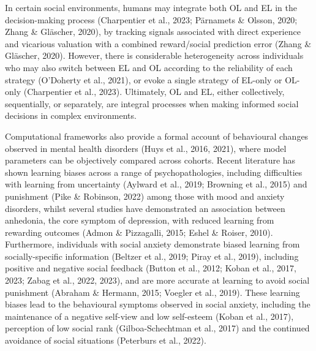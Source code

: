 \documentclass[12pt,a4paper,oneside,]{book} %
\begin{document}
In certain social environments, humans may integrate both OL and EL in the decision-making process (Charpentier et al., 2023; Pärnamets \& Olsson, 2020; Zhang \& Gläscher, 2020), by tracking signals associated with direct experience and vicarious valuation with a combined reward/social prediction error (Zhang \& Gläscher, 2020). However, there is considerable heterogeneity across individuals who may also switch between EL and OL according to the reliability of each strategy (O'Doherty et al., 2021), or evoke a single strategy of EL-only or OL-only (Charpentier et al., 2023). Ultimately, OL and EL, either collectively, sequentially, or separately, are integral processes when making informed social decisions in complex environments.

Computational frameworks also provide a formal account of behavioural changes observed in mental health disorders (Huys et al., 2016, 2021), where model parameters can be objectively compared across cohorts. Recent literature has shown learning biases across a range of psychopathologies, including difficulties with learning from uncertainty (Aylward et al., 2019; Browning et al., 2015) and punishment (Pike \& Robinson, 2022) among those with mood and anxiety disorders, whilst several studies have demonstrated an association between anhedonia, the core symptom of depression, with reduced learning from rewarding outcomes (Admon \& Pizzagalli, 2015; Eshel \& Roiser, 2010). Furthermore, individuals with social anxiety demonstrate biased learning from socially-specific information (Beltzer et al., 2019; Piray et al., 2019), including positive and negative social feedback (Button et al., 2012; Koban et al., 2017, 2023; Zabag et al., 2022, 2023), and are more accurate at learning to avoid social punishment (Abraham \& Hermann, 2015; Voegler et al., 2019). These learning biases lead to the behavioural symptoms observed in social anxiety, including the maintenance of a negative self-view and low self-esteem (Koban et al., 2017), perception of low social rank (Gilboa-Schechtman et al., 2017) and the continued avoidance of social situations (Peterburs et al., 2022).
\end{document}
